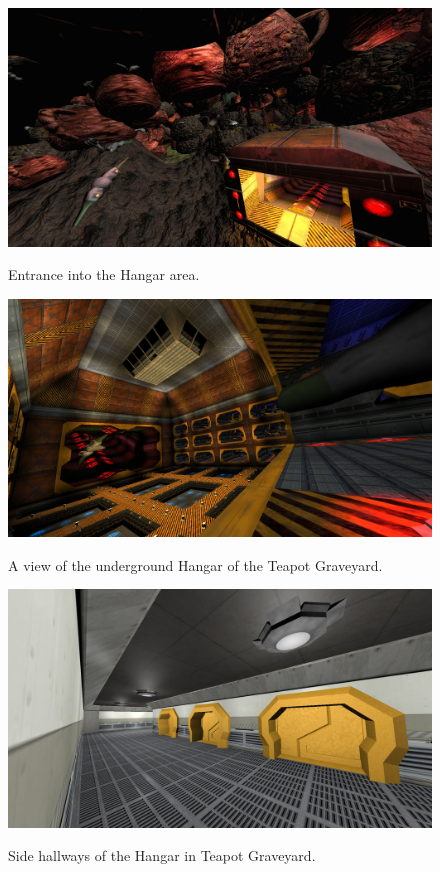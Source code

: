 \documentclass[12pt]{ucthesis}
\newcommand{\captionfonts}{\small\bf\ssp}
\begin{document}
\begin{figure}
\begin{center}
\includegraphics[width=\textwidth]{Images/HangarEntrance.jpg}
\captionfonts
\caption[Hangar Entrance]{Entrance into the Hangar area.}
\label{fig:hangar-entrance}

\includegraphics[width=\textwidth]{Images/Hangar.jpg}
\captionfonts
\caption[Hangar]{A view of the underground Hangar of the Teapot Graveyard.}
\label{fig:hangar}

\end{center}
\end{figure}

\begin{figure}
\begin{center}
\includegraphics[width=\textwidth]{Images/HallCorner.jpg}
\captionfonts
\caption[Hall Corner]{Side hallways of the Hangar in Teapot Graveyard.}
\label{fig:hall-corner}

\end{center}
\end{figure}
\end{document}
